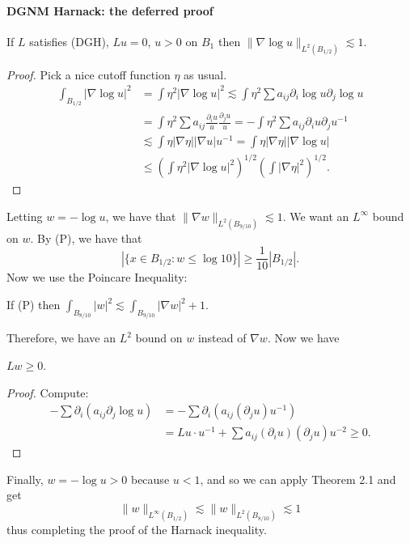 \paragraph{DGNM Harnack: the deferred proof}
\begin{lemma}[3.2]
If $L$ satisfies (DGH), $Lu=0$, $u>0$ on $B_1$ then $\|\nabla\log u\|_{L^2(B_{1/2})}\lesssim1$.
\end{lemma}
\begin{proof}
Pick a nice cutoff function $\eta$ as usual.
\begin{align*}
\int_{B_{1/2}}|\nabla\log u|^2&=\int\eta^2|\nabla\log u|^2\lesssim\int\eta^2\sum a_{ij}\partial_i\log u\partial_j\log u\\
&=\int\eta^2\sum a_{ij}\frac{\partial_i u}{u}\frac{\partial_j u}{u}
=-\int\eta^2\sum a_{ij}\partial_i u\partial_j u^{-1}\\
&\lesssim\int\eta|\nabla\eta||\nabla u|u^{-1}=\int\eta|\nabla\eta||\nabla\log u|\\
&\leq\left(\int\eta^2|\nabla\log u|^2\right)^{1/2}\left(\int|\nabla\eta|^2\right)^{1/2}.
\end{align*}
\end{proof}
Letting $w=-\log u$, we have that $\|\nabla w\|_{L^2(B_{9/10})}\lesssim1$. We want an $L^\infty$ bound on $w$. By (P), we have that
\[|\{x\in B_{1/2}:w\leq\log10\}|\geq\frac1{10}|B_{1/2}|.\]
Now we use the Poincare Inequality:
\begin{theorem}[3.3 (Poincare)]
If (P) then $\int_{B_{8/10}}|w|^2\lesssim\int_{B_{9/10}}|\nabla w|^2+1$.
\end{theorem}
Therefore, we have an $L^2$ bound on $w$ instead of $\nabla w$. Now we have
\begin{lemma}[3.3]
$Lw\geq0$.
\end{lemma}
\begin{proof}
Compute:
\begin{align*}
-\sum\partial_i(a_{ij}\partial_j\log u)&=-\sum\partial_i(a_{ij}(\partial_j u)u^{-1})\\
&=Lu\cdot u^{-1}+\sum a_{ij}(\partial_i u)(\partial_j u)u^{-2}\geq0.
\end{align*}
\end{proof}
Finally, $w=-\log u>0$ because $u<1$, and so we can apply Theorem 2.1 and get
\[\|w\|_{L^\infty(B_{1/2})}\lesssim\|w\|_{L^2(B_{8/10})}\lesssim1\]
thus completing the proof of the Harnack inequality.
